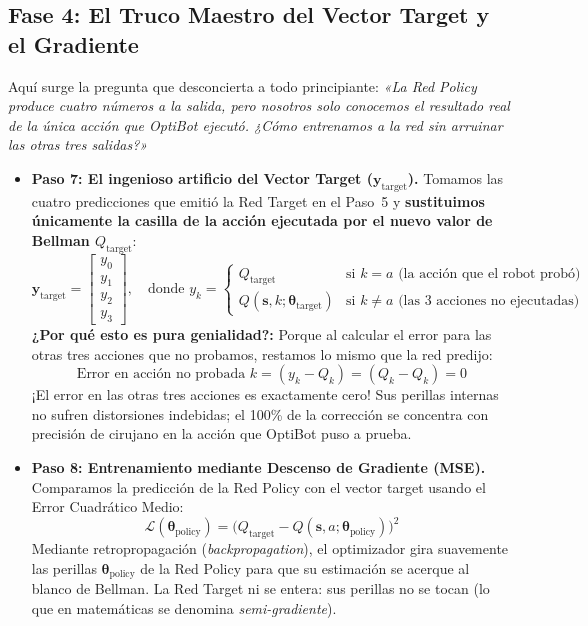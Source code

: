 \subsection{Fase 4: El Truco Maestro del Vector Target y el Gradiente}
Aquí surge la pregunta que desconcierta a todo principiante: \textit{«La Red Policy produce cuatro números a la salida, pero nosotros solo conocemos el resultado real de la única acción que OptiBot ejecutó. ¿Cómo entrenamos a la red sin arruinar las otras tres salidas?»}

\begin{itemize}
  \item \textbf{Paso 7: El ingenioso artificio del Vector Target ($\mathbf{y}_{\text{target}}$).}
  Tomamos las cuatro predicciones que emitió la Red Target en el Paso~5 y \textbf{sustituimos únicamente la casilla de la acción ejecutada por el nuevo valor de Bellman $Q_{\text{target}}$}:
  \begin{equation}
    \label{eq:vector_target_substitution}
    \mathbf{y}_{\text{target}} = \begin{bmatrix} y_0 \\ y_1 \\ y_2 \\ y_3 \end{bmatrix}, \quad \text{donde } 
    y_k = \begin{cases}
      Q_{\text{target}} & \text{si } k = a \text{ (la acción que el robot probó)} \\
      Q(\mathbf{s}, k; \boldsymbol{\theta}_{\text{target}}) & \text{si } k \ne a \text{ (las 3 acciones no ejecutadas)}
    \end{cases}
  \end{equation}
  \textbf{¿Por qué esto es pura genialidad?:} Porque al calcular el error para las otras tres acciones que no probamos, restamos lo mismo que la red predijo:
  \[
    \text{Error en acción no probada } k = (y_k - Q_k) = (Q_k - Q_k) = 0
  \]
  ¡El error en las otras tres acciones es exactamente cero! Sus perillas internas no sufren distorsiones indebidas; el 100\% de la corrección se concentra con precisión de cirujano en la acción que OptiBot puso a prueba.
  \item \textbf{Paso 8: Entrenamiento mediante Descenso de Gradiente (MSE).}
  Comparamos la predicción de la Red Policy con el vector target usando el Error Cuadrático Medio:
  \begin{equation}
    \mathcal{L}(\boldsymbol{\theta}_{\text{policy}}) = \big( Q_{\text{target}} - Q(\mathbf{s}, a; \boldsymbol{\theta}_{\text{policy}}) \big)^2
  \end{equation}
  Mediante retropropagación (\textit{backpropagation}), el optimizador gira suavemente las perillas $\boldsymbol{\theta}_{\text{policy}}$ de la Red Policy para que su estimación se acerque al blanco de Bellman. La Red Target ni se entera: sus perillas no se tocan (lo que en matemáticas se denomina \textit{semi-gradiente}).
\end{itemize}

